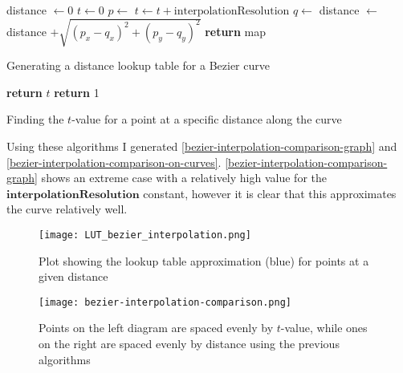     \begin{algorithm}
        \begin{algorithmic}
            \State distance $\gets 0$
            \State $t \gets 0$
                \State {}
                \State $p \gets$ 
                \State $t \gets t + \text{interpolationResolution}$
                \State $q \gets$ 
                \State distance $\gets$ distance $+ \sqrt{(p_x - q_x)^2 + (p_y - q_y)^2}$
            \EndWhile{}
            \State \textbf{return} map
        \end{algorithmic}
        \caption{Generating a distance lookup table for a Bezier curve}
        \label{generate-lookup-algorithm}
    \end{algorithm}

    \begin{algorithm}
        \begin{algorithmic}
                        \State \textbf{return} $t$
                    \EndIf
                \EndFor
                \State \textbf{return} 1
            \EndFunction
        \end{algorithmic}
        \caption{Finding the $t$-value for a point at a specific distance along the curve}
        \label{get-point-at-distance-algorithm}
    \end{algorithm}

    Using these algorithms I generated \autoref{bezier-interpolation-comparison-graph} and \autoref{bezier-interpolation-comparison-on-curves}. \autoref{bezier-interpolation-comparison-graph} shows an extreme case with a relatively high value for the $\textbf{interpolationResolution}$ constant, however it is clear that this approximates the curve relatively well.

    \begin{figure}
        \centering
        \texttt{[image: LUT\_bezier\_interpolation.png]}
        \caption{Plot showing the lookup table approximation (blue) for points at a given distance}
        \label{bezier-interpolation-comparison-graph}
    \end{figure}

    \begin{figure}
        \centering
        \texttt{[image: bezier-interpolation-comparison.png]}
        \caption{Points on the left diagram are spaced evenly by $t$-value, while ones on the right are spaced evenly by distance using the previous algorithms}
        \label{bezier-interpolation-comparison-on-curves}
    \end{figure}

